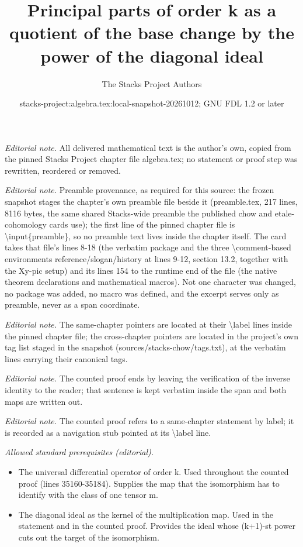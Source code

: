 \documentclass[10pt,a4paper]{amsart}
\title{Principal parts of order k as a quotient of the base change by the power of the diagonal ideal}
\author{The Stacks Project Authors}
\date{stacks-project:algebra.tex:local-snapshot-20261012; GNU FDL 1.2 or later}
\theoremstyle{plain}
\theoremstyle{definition}
\theoremstyle{remark}
\numberwithin{equation}{subsection}
\begin{document}
\maketitle
\noindent\textit{Editorial note.} All delivered mathematical text is the author's own, copied from the pinned Stacks Project chapter file algebra.tex; no statement or proof step was rewritten, reordered or removed.\par\medskip
\noindent\textit{Editorial note.} Preamble provenance, as required for this source: the frozen snapshot stages the chapter's own preamble file beside it (preamble.tex, 217 lines, 8116 bytes, the same shared Stacks-wide preamble the published chow and etale-cohomology cards use); the first line of the pinned chapter file is \textbackslash{}input\{preamble\}, so no preamble text lives inside the chapter itself. The card takes that file's lines 8-18 (the verbatim package and the three \textbackslash{}comment-based environments reference/slogan/history at lines 9-12, section 13.2, together with the Xy-pic setup) and its lines 154 to the runtime end of the file (the native theorem declarations and mathematical macros). Not one character was changed, no package was added, no macro was defined, and the excerpt serves only as preamble, never as a span coordinate.\par\medskip
\noindent\textit{Editorial note.} The same-chapter pointers are located at their \textbackslash{}label lines inside the pinned chapter file; the cross-chapter pointers are located in the project's own tag list staged in the snapshot (sources/stacks-chow/tags.txt), at the verbatim lines carrying their canonical tags.\par\medskip
\noindent\textit{Editorial note.} The counted proof ends by leaving the verification of the inverse identity to the reader; that sentence is kept verbatim inside the span and both maps are written out.\par\medskip
\noindent\textit{Editorial note.} The counted proof refers to a same-chapter statement by label; it is recorded as a navigation stub pointed at its \textbackslash{}label line.\par\medskip
\noindent\textit{Allowed standard prerequisites (editorial).}\begin{itemize}
\item The universal differential operator of order k. Used throughout the counted proof (lines 35160-35184). Supplies the map that the isomorphism has to identify with the class of one tensor m.
\item The diagonal ideal as the kernel of the multiplication map. Used in the statement and in the counted proof. Provides the ideal whose (k+1)-st power cuts out the target of the isomorphism.
\end{itemize}\medskip
\end{document}
